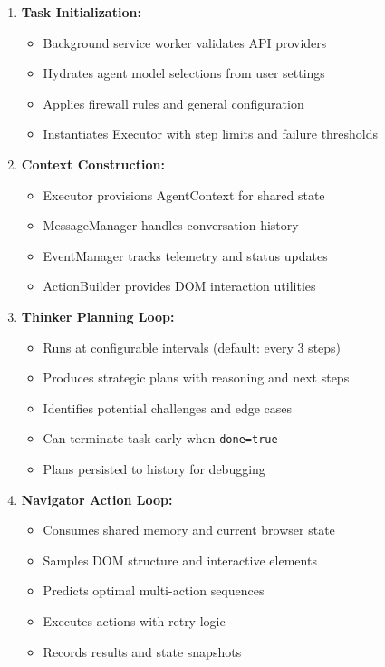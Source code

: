 \documentclass[12pt,a4paper]{article}
\begin{document}
\begin{enumerate}
    \item \textbf{Task Initialization:}
    \begin{itemize}
        \item Background service worker validates API providers
        \item Hydrates agent model selections from user settings
        \item Applies firewall rules and general configuration
        \item Instantiates Executor with step limits and failure thresholds
    \end{itemize}
    
    \item \textbf{Context Construction:}
    \begin{itemize}
        \item Executor provisions AgentContext for shared state
        \item MessageManager handles conversation history
        \item EventManager tracks telemetry and status updates
        \item ActionBuilder provides DOM interaction utilities
    \end{itemize}
    
    \item \textbf{Thinker Planning Loop:}
    \begin{itemize}
        \item Runs at configurable intervals (default: every 3 steps)
        \item Produces strategic plans with reasoning and next steps
        \item Identifies potential challenges and edge cases
        \item Can terminate task early when \texttt{done=true}
        \item Plans persisted to history for debugging
    \end{itemize}
    
    \item \textbf{Navigator Action Loop:}
    \begin{itemize}
        \item Consumes shared memory and current browser state
        \item Samples DOM structure and interactive elements
        \item Predicts optimal multi-action sequences
        \item Executes actions with retry logic
        \item Records results and state snapshots
    \end{itemize}
    

\end{enumerate}
\end{document}
